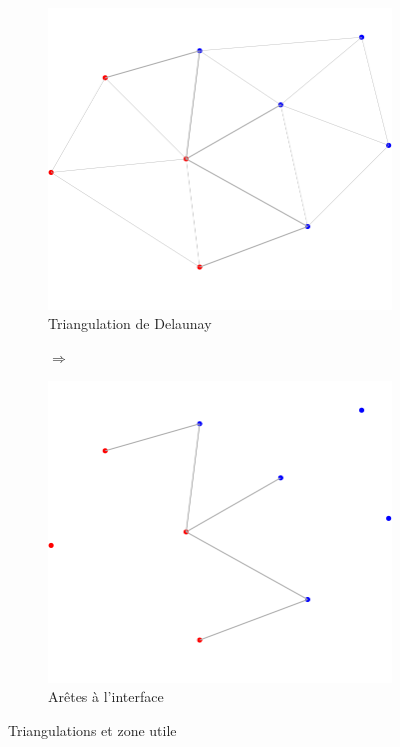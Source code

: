 \begin{figure}[ht]
\centering
\begin{subfigure}{0.45\textwidth}
  \centering
  \includegraphics[width=\textwidth]{figures/process_d_1.png}
  \caption{Triangulation de Delaunay}
  \label{fig::process_d_1}
\end{subfigure}%
\begin{subfigure}{0.1\textwidth}
  \centering
  $\Longrightarrow$
\end{subfigure}%
\begin{subfigure}{0.45\textwidth}
  \centering
  \includegraphics[width=\textwidth]{figures/process_d_2.png}
  \caption{Arêtes à l'interface}
  \label{fig:process_d_2}
\end{subfigure}
\caption{Triangulations et zone utile}
\label{fig:delaunays_process_1}
\end{figure}

